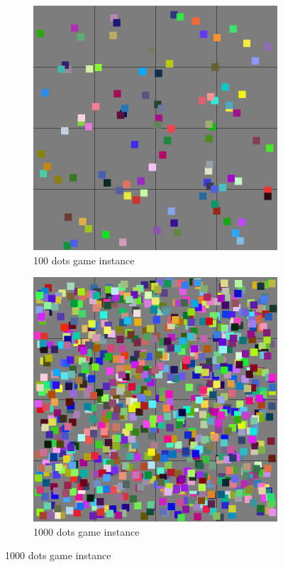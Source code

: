 \begin{figure}[h]
    \centering
    \begin{subfigure}{0.4\textwidth}
        \includegraphics[width=\linewidth]{images/100dots.png}
        \caption{100 dots game instance}
    \end{subfigure}
    \hspace{.05\linewidth}
    \begin{subfigure}{0.4\textwidth}
        \includegraphics[width=\linewidth]{images/1000dots.png}
        \caption{1000 dots game instance}
    \end{subfigure}


\end{figure}
